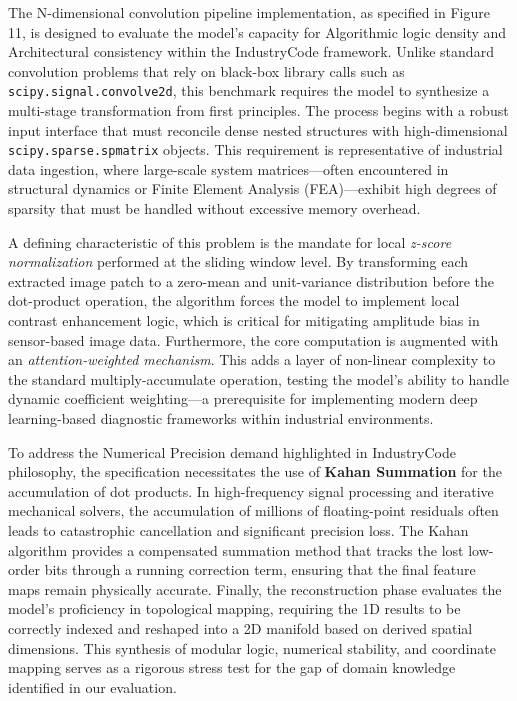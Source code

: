 \documentclass{article}
\theoremstyle{plain}
\theoremstyle{definition}
\theoremstyle{remark}
\begin{document}
The N-dimensional convolution pipeline implementation, as specified in Figure 11, is designed to evaluate the model's capacity for Algorithmic logic density and Architectural consistency within the IndustryCode framework. Unlike standard convolution problems that rely on black-box library calls such as \texttt{scipy.signal.convolve2d}, this benchmark requires the model to synthesize a multi-stage transformation from first principles. The process begins with a robust input interface that must reconcile dense nested structures with high-dimensional \texttt{scipy.sparse.spmatrix} objects. This requirement is representative of industrial data ingestion, where large-scale system matrices—often encountered in structural dynamics or Finite Element Analysis (FEA)—exhibit high degrees of sparsity that must be handled without excessive memory overhead.

A defining characteristic of this problem is the mandate for local \textit{z-score normalization} performed at the sliding window level. By transforming each extracted image patch to a zero-mean and unit-variance distribution before the dot-product operation, the algorithm forces the model to implement local contrast enhancement logic, which is critical for mitigating amplitude bias in sensor-based image data. Furthermore, the core computation is augmented with an \textit{attention-weighted mechanism}. This adds a layer of non-linear complexity to the standard multiply-accumulate operation, testing the model's ability to handle dynamic coefficient weighting—a prerequisite for implementing modern deep learning-based diagnostic frameworks within industrial environments.

To address the Numerical Precision demand highlighted in IndustryCode philosophy, the specification necessitates the use of \textbf{Kahan Summation} for the accumulation of dot products. In high-frequency signal processing and iterative mechanical solvers, the accumulation of millions of floating-point residuals often leads to catastrophic cancellation and significant precision loss. The Kahan algorithm provides a compensated summation method that tracks the lost low-order bits through a running correction term, ensuring that the final feature maps remain physically accurate. Finally, the reconstruction phase evaluates the model's proficiency in topological mapping, requiring the 1D results to be correctly indexed and reshaped into a 2D manifold based on derived spatial dimensions. This synthesis of modular logic, numerical stability, and coordinate mapping serves as a rigorous stress test for the gap of domain knowledge  identified in our evaluation.
\end{document}
